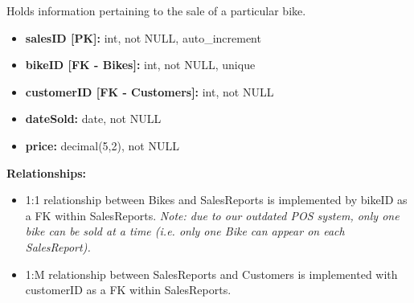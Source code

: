 \documentclass{article}
\begin{document}
\begin{tcolorbox}[colback=secondarycolor, colframe=primarycolor, title=\textbf{SalesReports Table}]
Holds information pertaining to the sale of a particular bike.
\vspace{0.2cm}

\begin{itemize}
  \item \textbf{salesID [PK]:} int, not NULL, auto\_increment
  \item \textbf{bikeID [FK - Bikes]:} int, not NULL, unique
  \item \textbf{customerID [FK - Customers]:} int, not NULL
  \item \textbf{dateSold:} date, not NULL
  \item \textbf{price:} decimal(5,2), not NULL
\end{itemize}
\vspace{0.2cm}

\textbf{Relationships:}
\vspace{0.2cm}
\begin{itemize}
  \item 1:1 relationship between Bikes and SalesReports is implemented by bikeID as a FK within SalesReports. \textit{Note: due to our outdated POS system, only one bike can be sold at a time (i.e. only one Bike can appear on each SalesReport).}
  \item 1:M relationship between SalesReports and Customers is implemented with customerID as a FK within SalesReports.
\end{itemize}
\end{tcolorbox}

\vspace{0.5cm}
\end{document}
